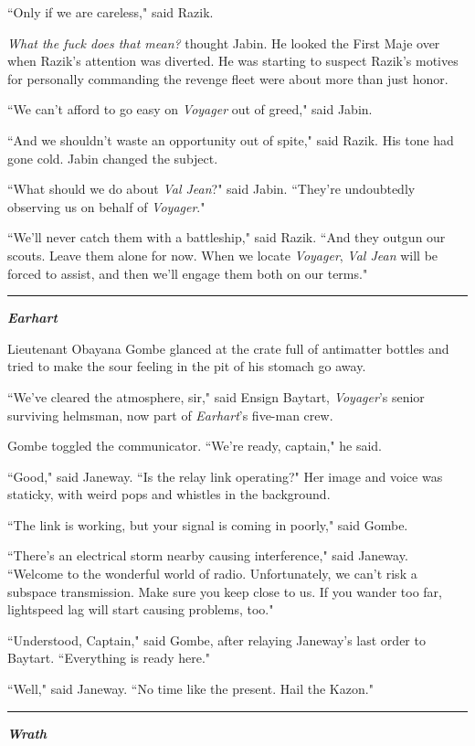 \documentclass[twoside,letterpaper,12pt]{memoir}
\begin{document}
``Only if we are careless," said Razik.

\textit{What the fuck does that mean?} thought Jabin. He looked the First Maje over when Razik's attention was diverted. He was starting to suspect Razik's motives for personally commanding the revenge fleet were about more than just honor.

``We can't afford to go easy on \textit{Voyager} out of greed," said Jabin.

``And we shouldn't waste an opportunity out of spite," said Razik. His tone had gone cold. Jabin changed the subject.

``What should we do about \textit{Val Jean}?" said Jabin. ``They're undoubtedly observing us on behalf of \textit{Voyager}."

``We'll never catch them with a battleship," said Razik. ``And they outgun our scouts. Leave them alone for now. When we locate \textit{Voyager}, \textit{Val Jean} will be forced to assist, and then we'll engage them both on our terms."

\fancybreak{\rule{3cm}{0.4 pt}}
\textit{\textbf{Earhart}}

Lieutenant Obayana Gombe glanced at the crate full of antimatter bottles and tried to make the sour feeling in the pit of his stomach go away.

``We've cleared the atmosphere, sir," said Ensign Baytart, \textit{Voyager}'s senior surviving helmsman, now part of \textit{Earhart}'s five-man crew.

Gombe toggled the communicator. ``We're ready, captain," he said.

``Good," said Janeway. ``Is the relay link operating?" Her image and voice was staticky, with weird pops and whistles in the background.

``The link is working, but your signal is coming in poorly," said Gombe.

``There's an electrical storm nearby causing interference," said Janeway. ``Welcome to the wonderful world of radio. Unfortunately, we can't risk a subspace transmission. Make sure you keep close to us. If you wander too far, lightspeed lag will start causing problems, too."

``Understood, Captain," said Gombe, after relaying Janeway's last order to Baytart. ``Everything is ready here."

``Well," said Janeway. ``No time like the present. Hail the Kazon."

\fancybreak{\rule{3cm}{0.4 pt}}
\noindent\textit{\textbf{Wrath}}\\
\end{document}
